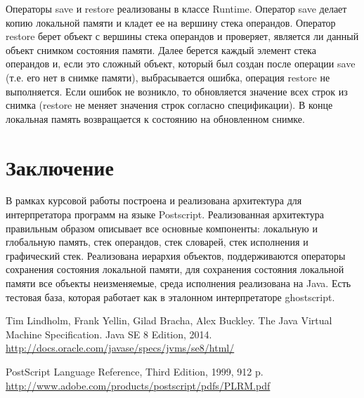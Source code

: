 \documentclass[14pt]{extarticle}
\begin{document}
Операторы save и restore реализованы в классе Runtime. Оператор save делает копию локальной памяти и кладет ее на вершину стека операндов. Оператор restore берет объект с вершины стека операндов и проверяет, является ли данный объект снимком состояния памяти. Далее берется каждый элемент стека операндов и, если это сложный объект, который был создан после операции save (т.е. его нет в снимке памяти), выбрасывается ошибка, операция restore не выполняется. Если ошибок не возникло, то обновляется значение всех строк из снимка (restore не меняет значения строк согласно спецификации). В конце локальная память возвращается к состоянию на обновленном снимке. 
\pagebreak
\pagebreak
\section*{Заключение}

В рамках курсовой работы построена и реализована архитектура для интерпретатора программ на языке Postscript. Реализованная архитектура правильным образом описывает все основные компоненты: локальную и глобальную память, стек операндов, стек словарей, стек исполнения и графический стек. Реализована иерархия объектов, поддерживаются операторы сохранения состояния локальной памяти, для сохранения состояния локальной памяти все объекты неизменяемые, среда исполнения реализована на Java. Есть тестовая база, которая работает как в эталонном интерпретаторе ghostscript.

\pagebreak

%

\begin{thebibliography}{}
Tim Lindholm, Frank Yellin, Gilad Bracha, Alex Buckley.
The Java Virtual Machine Specification.
Java SE 8 Edition, 2014. \\
\url{http://docs.oracle.com/javase/specs/jvms/se8/html/}

PostScript Language Reference, Third Edition, 1999, 912 p. \\
\url{http://www.adobe.com/products/postscript/pdfs/PLRM.pdf}

\end{thebibliography}
\end{document}
